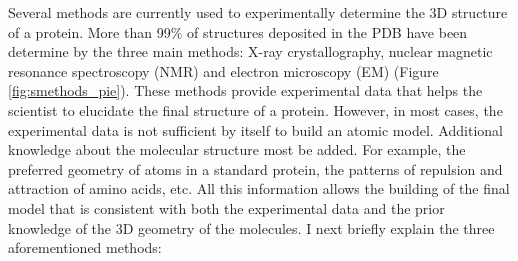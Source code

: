 \documentclass[11pt, b5paper,twoside]{tesi_upf}
\begin{document}
\par Several methods are currently used to experimentally determine the 3D structure of a protein. More than 99$\%$ of structures deposited in the PDB have been determine by the three main methods:  X-ray crystallography, nuclear magnetic resonance  spectroscopy (NMR) and electron microscopy (EM) (Figure \ref{fig:smethods_pie}). These methods provide experimental data that helps the scientist to elucidate the final structure of a protein. However, in most cases, the experimental data is not sufficient by itself to build an atomic model. Additional knowledge about the molecular structure most be added. For example, the preferred geometry of atoms in a standard protein, the patterns of repulsion and attraction of amino acids, etc. All this information allows the building of the final model that is consistent with both the experimental data and the prior knowledge of the 3D geometry of the molecules. I next briefly explain the three aforementioned methods:
\end{document}
